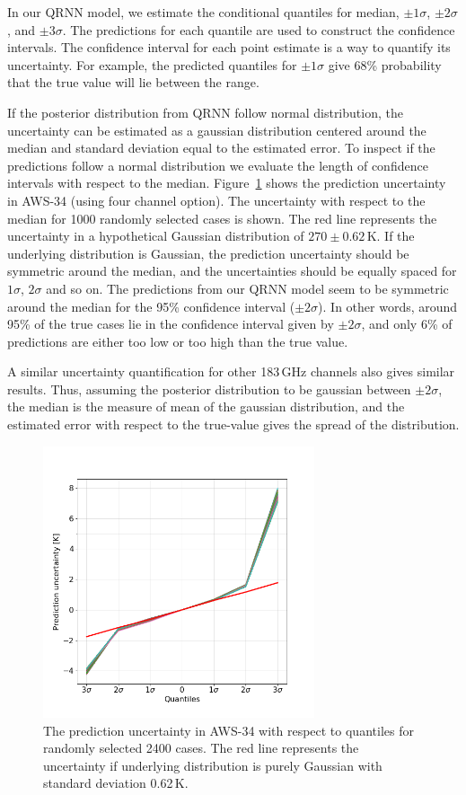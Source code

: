 \documentclass[12pt]{article}
\begin{document}
In our QRNN model, we estimate the conditional quantiles for  median, $\pm 1\sigma$, $\pm 2\sigma$, and $\pm 3\sigma$. The predictions for each quantile are used to construct the confidence intervals. The confidence interval for each point estimate is a way to quantify its uncertainty. For example, the predicted quantiles for $\pm 1 \sigma$ give 68\% probability that the true value will lie between the range.   

If the posterior distribution from QRNN follow normal distribution, the uncertainty can be estimated as a gaussian distribution centered around the median and standard deviation equal to the estimated error. To inspect if the predictions follow a normal distribution we evaluate the length of confidence intervals with respect to the median. Figure~\ref{fig:prediction_uncertainty} shows the prediction uncertainty in AWS-34 (using four channel option). The uncertainty with respect to the median for 1000 randomly selected cases is shown. The red line represents the uncertainty in a hypothetical Gaussian distribution  of $270\pm0.62$\,K. If the underlying distribution is Gaussian, the prediction uncertainty should be symmetric around the median, and the uncertainties should be equally spaced for $1\sigma$, $2\sigma$ and so on. The predictions from our QRNN model seem to be symmetric around the median for the 95\% confidence interval ($\pm 2 \sigma$). In other words, around 95\% of the true cases lie in the confidence interval given by $\pm 2\sigma$, and only 6\% of predictions are either too low or too high than the true value. 

A similar uncertainty quantification for other 183\,GHz channels also gives similar results. Thus, assuming the posterior distribution to be gaussian between $\pm 2 \sigma$, the median is the measure of mean of the gaussian distribution, and the estimated error with respect to the true-value gives the spread of the distribution. 
\begin{figure}[!tb]
	\centering
	\includegraphics[height=80mm]{prediction_uncertainty.png}
	\caption{The prediction uncertainty in AWS-34 with respect to quantiles for randomly selected 2400 cases. The red line represents the uncertainty if underlying distribution is purely Gaussian with standard deviation 0.62\,K. }
	\label{fig:prediction_uncertainty}
\end{figure}
\end{document}
